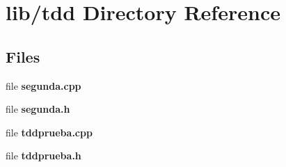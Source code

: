 \section{lib/tdd Directory Reference}
\label{dir_f5d10243007504f24d79741f94a4d999}
\subsection*{Files}
\begin{DoxyCompactItemize}
\item 
file {\bfseries segunda.\+cpp}
\item 
file {\bfseries segunda.\+h}
\item 
file {\bfseries tddprueba.\+cpp}
\item 
file {\bfseries tddprueba.\+h}
\end{DoxyCompactItemize}
